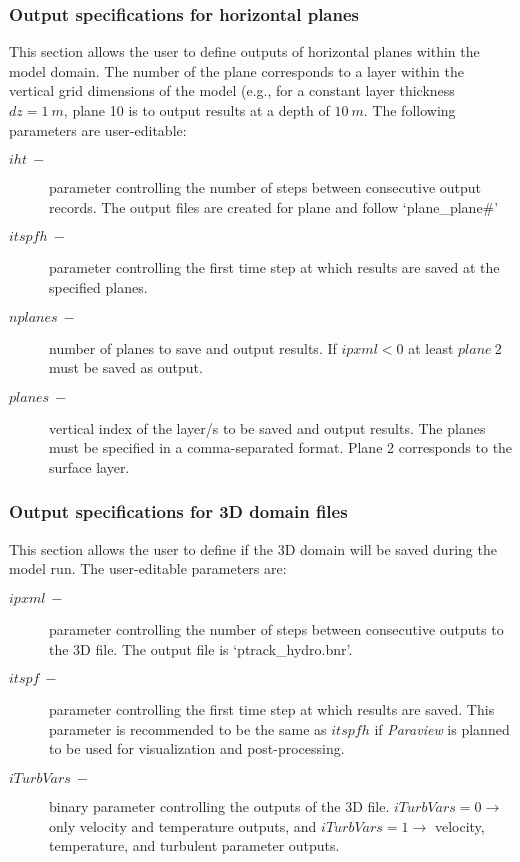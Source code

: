 \subsubsection{Output specifications for horizontal planes}
This section allows the user to define outputs of horizontal planes within the model domain. The number of the plane corresponds to a layer within the vertical grid dimensions of the model (e.g., for a constant layer thickness $dz = 1\ m$, plane 10 is to output results at a depth of $10\ m$. The following parameters are user-editable:

\begin{description}
    \item [$iht\ -$] parameter controlling the number of steps between consecutive output records. The output files are created for plane and follow `plane\_plane\#'
    \item [$itspfh\ -$] parameter controlling the first time step at which results are saved at the specified planes.
    \item [$nplanes\ -$] number of planes to save and output results. If $ipxml < 0$ at least $plane\ 2$ must be saved as output.
    \item [$planes\ -$] vertical index of the layer/s to be saved and output results. The planes must be specified in a comma-separated format. Plane 2 corresponds to the surface layer. 
\end{description}

\subsubsection{Output specifications for 3D domain files}
This section allows the user to define if the 3D domain will be saved during the model run. The user-editable parameters are:

\begin{description}
    \item [$ipxml\ -$] parameter controlling the number of steps between consecutive outputs to the 3D file. The output file is `ptrack\_hydro.bnr'.
    \item [$itspf\ -$] parameter controlling the first time step at which results are saved. This parameter is recommended to be the same as $itspfh$ if \textit{Paraview} is planned to be used for visualization and post-processing. 
    \item [$iTurbVars\ -$] binary parameter controlling the outputs of the 3D file. $iTurbVars = 0 \rightarrow$ only velocity and temperature outputs, and $iTurbVars = 1 \rightarrow$ velocity, temperature, and turbulent parameter outputs. 
\end{description}

